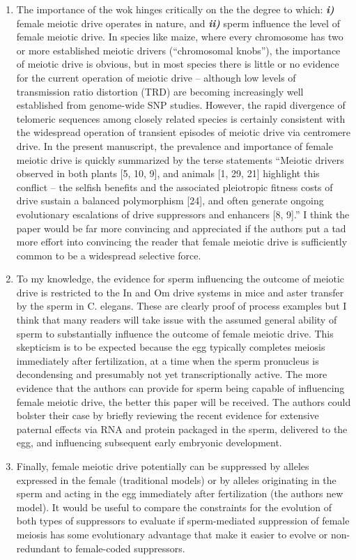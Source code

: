 \documentclass[12pt,letterpaper]{article}
\begin{document}
\begin{enumerate}
\item	The importance of the wok hinges critically on the the degree to which:  {\bf{\emph{i)}}}
female meiotic drive operates in nature, and {\bf{\emph{ii)}}} sperm influence the level of
female meiotic drive.  In species like maize, where every chromosome has two or
more established meiotic drivers (``chromosomal knobs''), the importance of
meiotic drive is obvious, but in most species there is little or no evidence for
the current operation of meiotic drive -- although low levels of transmission
ratio distortion (TRD) are becoming increasingly well established from
genome-wide SNP studies.  However, the rapid divergence of telomeric sequences
among closely related species is certainly consistent with the widespread
operation of transient episodes of meiotic drive via centromere drive.  In the
present manuscript, the prevalence and importance of female meiotic drive is
quickly summarized by the terse statements ``Meiotic drivers observed in both
plants [5, 10, 9], and animals [1, 29, 21] highlight this conflict -- the selfish
benefits and the associated pleiotropic fitness costs of drive sustain a
balanced polymorphism [24], and often generate ongoing evolutionary escalations
of drive suppressors and enhancers [8, 9].''  I think the paper would be far more
convincing and appreciated if the authors put a tad more effort into convincing
the reader that female meiotic drive is sufficiently common to be a widespread
selective force.

\item	 To my knowledge, the evidence for sperm influencing the outcome of meiotic
drive is restricted to the In and Om drive systems in mice and aster transfer by
the sperm in C. elegans.  These are clearly proof of process examples but I
think that many readers will take issue with the assumed general ability of
sperm to substantially influence the outcome of female meiotic drive. This
skepticism is to be expected  because the egg typically completes meiosis
immediately after fertilization, at a time when the sperm pronucleus is
decondensing and presumably not yet transcriptionally active. The more evidence
that the authors can provide for sperm being capable of influencing female
meiotic drive, the better this paper will be received. The authors could bolster
their case by briefly reviewing the recent evidence for extensive paternal
effects via RNA and protein packaged in the sperm, delivered to the egg, and
influencing subsequent early embryonic development. 

\item	Finally, female meiotic drive potentially can be suppressed by alleles
expressed in the female (traditional models) or by alleles originating in the
sperm and acting in the egg immediately after fertilization (the authors new
model).  It would be useful to compare the constraints for the evolution of both
types of suppressors to evaluate if sperm-mediated suppression of female meiosis
has some evolutionary advantage that make it easier to evolve or non-redundant
to female-coded suppressors.
\end{enumerate}
\end{document}

